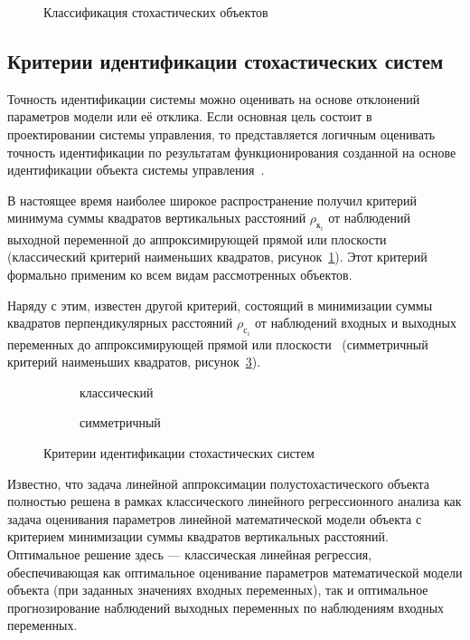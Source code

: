 \begin{figure}[p]
  \vspace{\baselineskip}
  \caption{Классификация стохастических объектов}
\end{figure}

\subsection{Критерии идентификации стохастических систем}

Точность идентификации системы можно оценивать на основе отклонений параметров модели или её отклика.
Если основная цель состоит в проектировании системы управления, то представляется логичным
оценивать точность идентификации по результатам функционирования созданной на основе идентификации
объекта системы управления~\cite{eikhoff_1975}.

В настоящее время наиболее широкое распространение получил критерий
минимума суммы квадратов вертикальных расстояний \( \rho_{\text{к}_i} \) от наблюдений выходной переменной
до аппроксимирующей прямой или плоскости
(классический критерий наименьших квадратов, рисунок~\ref{fig:criteria_classic}).
Этот критерий формально применим ко всем видам рассмотренных объектов.

Наряду с этим, известен другой критерий, состоящий в минимизации суммы квадратов
перпендикулярных расстояний \( \rho_{\text{с}_i} \) от наблюдений входных и выходных переменных до
аппроксимирующей прямой или плоскости~\cite{pearson_1901, mukha_2016}
(симметричный критерий наименьших квадратов, рисунок~\ref{fig:criteria_symmetric}).

\begin{figure}[h]
  \begin{subfigure}[b]{0.5\linewidth}
    \centering
    \caption{классический}\label{fig:criteria_classic}
  \end{subfigure}
  \hfill
  \begin{subfigure}[b]{0.5\linewidth}
    \centering
    \caption{симметричный}\label{fig:criteria_symmetric}
  \end{subfigure}

  \vspace{\baselineskip}
  \caption{Критерии идентификации стохастических систем}
\end{figure}

Известно, что задача линейной аппроксимации полустохастического объекта полностью решена в
рамках классического линейного регрессионного анализа как задача оценивания параметров
линейной математической модели объекта с критерием минимизации суммы квадратов вертикальных расстояний.
Оптимальное решение здесь --- классическая линейная регрессия,
обеспечивающая как оптимальное оценивание параметров математической модели объекта
(при заданных значениях входных переменных),
так и оптимальное прогнозирование наблюдений выходных переменных по наблюдениям входных переменных.

